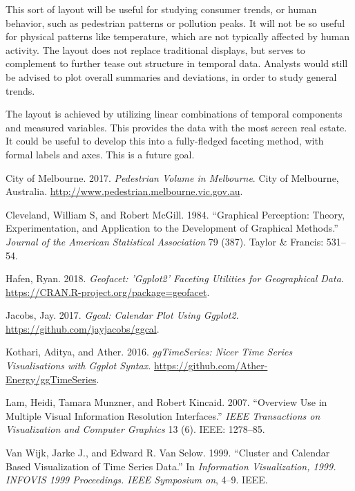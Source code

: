 This sort of layout will be useful for studying consumer trends, or
human behavior, such as pedestrian patterns or pollution peaks. It will
not be so useful for physical patterns like temperature, which are not
typically affected by human activity. The layout does not replace
traditional displays, but serves to complement to further tease out
structure in temporal data. Analysts would still be advised to plot
overall summaries and deviations, in order to study general trends.

The layout is achieved by utilizing linear combinations of temporal
components and measured variables. This provides the data with the most
screen real estate. It could be useful to develop this into a
fully-fledged faceting method, with formal labels and axes. This is a
future goal.

\hypertarget{refs}{}
\leavevmode\hypertarget{ref-ped}{}%
City of Melbourne. 2017. \emph{Pedestrian Volume in Melbourne}. City of
Melbourne, Australia. \url{http://www.pedestrian.melbourne.vic.gov.au}.

\leavevmode\hypertarget{ref-cleveland1984graphical}{}%
Cleveland, William S, and Robert McGill. 1984. ``Graphical Perception:
Theory, Experimentation, and Application to the Development of Graphical
Methods.'' \emph{Journal of the American Statistical Association} 79
(387). Taylor \& Francis: 531--54.

\leavevmode\hypertarget{ref-R-geofacet}{}%
Hafen, Ryan. 2018. \emph{Geofacet: 'Ggplot2' Faceting Utilities for
Geographical Data}. \url{https://CRAN.R-project.org/package=geofacet}.

\leavevmode\hypertarget{ref-R-ggcal}{}%
Jacobs, Jay. 2017. \emph{Ggcal: Calendar Plot Using Ggplot2}.
\url{https://github.com/jayjacobs/ggcal}.

\leavevmode\hypertarget{ref-R-ggTimeSeries}{}%
Kothari, Aditya, and Ather. 2016. \emph{ggTimeSeries: Nicer Time Series
Visualisations with Ggplot Syntax.}
\url{https://github.com/Ather-Energy/ggTimeSeries}.

\leavevmode\hypertarget{ref-lam2007overview}{}%
Lam, Heidi, Tamara Munzner, and Robert Kincaid. 2007. ``Overview Use in
Multiple Visual Information Resolution Interfaces.'' \emph{IEEE
Transactions on Visualization and Computer Graphics} 13 (6). IEEE:
1278--85.

\leavevmode\hypertarget{ref-VanWijkCluster1999}{}%
Van Wijk, Jarke J., and Edward R. Van Selow. 1999. ``Cluster and
Calendar Based Visualization of Time Series Data.'' In \emph{Information
Visualization, 1999. INFOVIS 1999 Proceedings. IEEE Symposium on}, 4--9.
IEEE.

